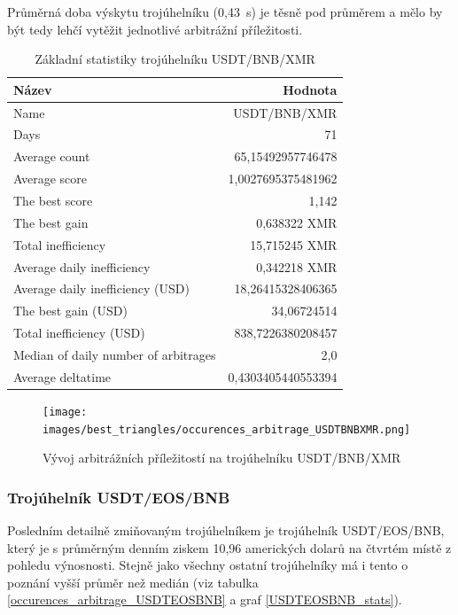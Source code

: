 \documentclass[thesis=B,czech]{FITthesis}[2019/03/21]
\begin{document}
Průměrná doba výskytu trojúhelníku (0,43~s) je těsně pod průměrem a mělo by být tedy lehčí vytěžit jednotlivé arbitrážní příležitosti.

\begin{table}\centering
\caption{Základní statistiky trojúhelníku USDT/BNB/XMR}
\label{USDTBNBXMR_stats}
\begin{tabular}{|| l | r ||}
\hline Název & Hodnota \\ 
\hline\hline Name & USDT/BNB/XMR \\ 
\hline Days & 71 \\ 
\hline Average count & 65,15492957746478 \\ 
\hline Average score & 1,0027695375481962 \\ 
\hline The best score & 1,142 \\ 
\hline The best gain & 0,638322 XMR \\ 
\hline Total inefficiency & 15,715245 XMR \\ 
\hline Average daily inefficiency & 0,342218 XMR \\ 
\hline Average daily inefficiency (USD) & 18,26415328406365 \\ 
\hline The best gain (USD) & 34,06724514 \\ 
\hline Total inefficiency (USD) & 838,7226380208457 \\ 
\hline Median of daily number of arbitrages & 2,0 \\ 
\hline Average deltatime & 0,4303405440553394 \\ 
\hline
\end{tabular}
\end{table}

\begin{figure}\centering
	\texttt{[image: images/best\_triangles/occurences\_arbitrage\_USDTBNBXMR.png]}
	\caption{Vývoj arbitrážních příležitostí na trojúhelníku USDT/BNB/XMR }\label{occurences_arbitrage_USDTBNBXMR}
\end{figure}

\subsubsection{Trojúhelník USDT/EOS/BNB}

Posledním detailně zmiňovaným trojúhelníkem je trojúhelník USDT/EOS/BNB, který je s průměrným denním ziskem 10,96 amerických dolarů na čtvrtém místě z pohledu výnosnosti. Stejně jako všechny ostatní trojúhelníky má i tento o poznání vyšší průměr než medián (viz tabulka \ref{occurences_arbitrage_USDTEOSBNB} a graf \ref{USDTEOSBNB_stats}).
\end{document}
